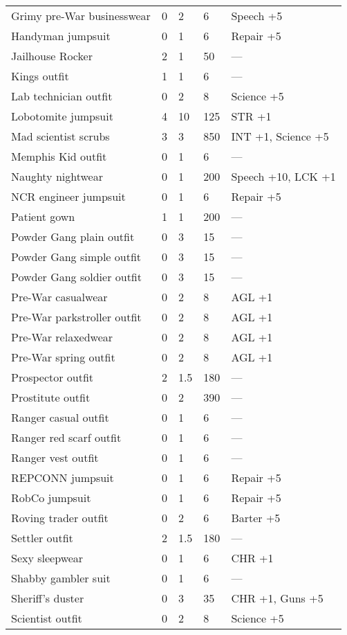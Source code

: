 \begin{longtable}{|p{4cm}|p{1.2cm}|p{1.2cm}|p{1.2cm}|p{4cm}|}
Grimy pre-War businesswear  & 0 & 2 & 6 & Speech +5  \\
Handyman jumpsuit  & 0 & 1 & 6 & Repair +5  \\
Jailhouse Rocker  & 2 & 1 & 50 & —  \\
Kings outfit  & 1 & 1 & 6 & —  \\
Lab technician outfit  & 0 & 2 & 8 & Science +5  \\
Lobotomite jumpsuit  & 4 & 10 & 125 & STR +1  \\
Mad scientist scrubs  & 3 & 3 & 850 & INT +1, Science +5  \\
Memphis Kid outfit  & 0 & 1 & 6 & —  \\
Naughty nightwear  & 0 & 1 & 200 & Speech +10, LCK +1  \\
NCR engineer jumpsuit  & 0 & 1 & 6 & Repair +5  \\
Patient gown  & 1 & 1 & 200 & —  \\
Powder Gang plain outfit  & 0 & 3 & 15 & —  \\
Powder Gang simple outfit  & 0 & 3 & 15 & —  \\
Powder Gang soldier outfit  & 0 & 3 & 15 & —  \\
Pre-War casualwear  & 0 & 2 & 8 & AGL +1  \\
Pre-War parkstroller outfit  & 0 & 2 & 8 & AGL +1  \\
Pre-War relaxedwear  & 0 & 2 & 8 & AGL +1  \\
Pre-War spring outfit  & 0 & 2 & 8 & AGL +1  \\
Prospector outfit  & 2 & 1.5  & 180 & —  \\
Prostitute outfit  & 0 & 2 & 390 & —  \\
Ranger casual outfit  & 0 & 1 & 6 & —  \\
Ranger red scarf outfit  & 0 & 1 & 6 & —  \\
Ranger vest outfit  & 0 & 1 & 6 & —  \\
REPCONN jumpsuit  & 0 & 1 & 6 & Repair +5  \\
RobCo jumpsuit  & 0 & 1 & 6 & Repair +5  \\
Roving trader outfit  & 0 & 2 & 6 & Barter +5  \\
Settler outfit  & 2 & 1.5  & 180 & —  \\
Sexy sleepwear  & 0 & 1 & 6 & CHR +1  \\
Shabby gambler suit  & 0 & 1 & 6 & —  \\
Sheriff's duster  & 0 & 3 & 35 & CHR +1, Guns +5  \\
Scientist outfit  & 0 & 2 & 8 & Science +5  \\

\end{longtable}

